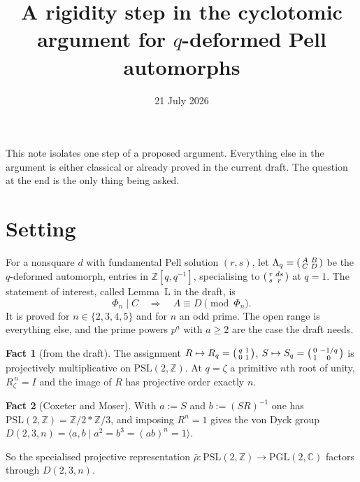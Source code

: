 \documentclass[11pt]{amsart}
\title{A rigidity step in the cyclotomic argument for $q$-deformed Pell automorphs}
\date{21 July 2026}
\theoremstyle{definition}
\newtheorem{fact}{Fact}
\newcommand{\PSL}{\mathrm{PSL}}
\newcommand{\PGL}{\mathrm{PGL}}
\newcommand{\Z}{\mathbb{Z}}
\newcommand{\C}{\mathbb{C}}
\newcommand{\Phin}[1]{\Phi_{#1}}
\begin{document}
\maketitle

\noindent
This note isolates one step of a proposed argument. Everything else in the
argument is either classical or already proved in the current draft. The
question at the end is the only thing being asked.

\section*{Setting}

For a nonsquare $d$ with fundamental Pell solution $(r,s)$, let
$\Lambda_q=\begin{psmallmatrix}A&B\\C&D\end{psmallmatrix}$ be the $q$-deformed
automorph, entries in $\Z[q,q^{-1}]$, specialising to
$\begin{psmallmatrix}r&ds\\s&r\end{psmallmatrix}$ at $q=1$. The statement of
interest, called Lemma~L in the draft, is
\[
  \Phin{n}\mid C \quad\Longrightarrow\quad A\equiv D \pmod{\Phin{n}} .
\]
It is proved for $n\in\{2,3,4,5\}$ and for $n$ an odd prime. The open range is
everything else, and the prime powers $p^{a}$ with $a\ge 2$ are the case the
draft needs.

\begin{fact}[from the draft]
The assignment $R\mapsto R_q=\begin{psmallmatrix}q&1\\0&1\end{psmallmatrix}$,
$S\mapsto S_q=\begin{psmallmatrix}0&-1/q\\1&0\end{psmallmatrix}$ is
projectively multiplicative on $\PSL(2,\Z)$. At $q=\zeta$ a primitive $n$th
root of unity, $R_\zeta^{\,n}=I$ and the image of $R$ has projective order
exactly $n$.
\end{fact}

\begin{fact}[Coxeter and Moser]
With $a:=S$ and $b:=(SR)^{-1}$ one has $\PSL(2,\Z)=\Z/2*\Z/3$, and imposing
$R^{n}=1$ gives the von Dyck group
$D(2,3,n)=\langle a,b \mid a^{2}=b^{3}=(ab)^{n}=1\rangle$.
\end{fact}

So the specialised projective representation
$\bar\rho:\PSL(2,\Z)\to\PGL(2,\C)$ factors through $D(2,3,n)$.
\end{document}
